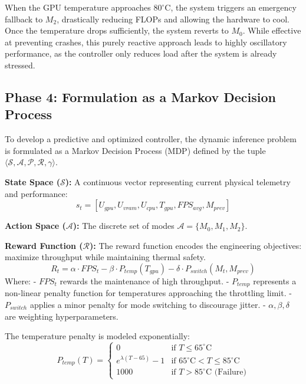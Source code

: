 \documentclass{ieeeaccess}
\begin{document}
When the GPU temperature approaches $80^\circ$C, the system triggers an emergency fallback to $M_2$, drastically reducing FLOPs and allowing the hardware to cool. Once the temperature drops sufficiently, the system reverts to $M_0$. While effective at preventing crashes, this purely reactive approach leads to highly oscillatory performance, as the controller only reduces load after the system is already stressed.

\subsection{Phase 4: Formulation as a Markov Decision Process}
To develop a predictive and optimized controller, the dynamic inference problem is formulated as a Markov Decision Process (MDP) defined by the tuple $\langle \mathcal{S}, \mathcal{A}, \mathcal{P}, \mathcal{R}, \gamma \rangle$.

\textbf{State Space ($\mathcal{S}$):}
A continuous vector representing current physical telemetry and performance:
\begin{equation}
s_t = [U_{gpu}, U_{vram}, U_{cpu}, T_{gpu}, FPS_{avg}, M_{prev}]
\end{equation}

\textbf{Action Space ($\mathcal{A}$):}
The discrete set of modes $\mathcal{A} = \{M_0, M_1, M_2\}$.

\textbf{Reward Function ($\mathcal{R}$):}
The reward function encodes the engineering objectives: maximize throughput while maintaining thermal safety.
\begin{equation}
R_t = \alpha \cdot FPS_t - \beta \cdot P_{temp}(T_{gpu}) - \delta \cdot P_{switch}(M_t, M_{prev})
\end{equation}
Where:
- $FPS_t$ rewards the maintenance of high throughput.
- $P_{temp}$ represents a non-linear penalty function for temperatures approaching the throttling limit.
- $P_{switch}$ applies a minor penalty for mode switching to discourage jitter.
- $\alpha, \beta, \delta$ are weighting hyperparameters.

The temperature penalty is modeled exponentially:
\begin{equation}
P_{temp}(T) =
\begin{cases}
0 & \text{if } T \leq 65^\circ\text{C} \\
e^{\lambda (T - 65)} - 1 & \text{if } 65^\circ\text{C} < T \leq 85^\circ\text{C} \\
1000 & \text{if } T > 85^\circ\text{C} \text{ (Failure)}
\end{cases}
\end{equation}
\end{document}
